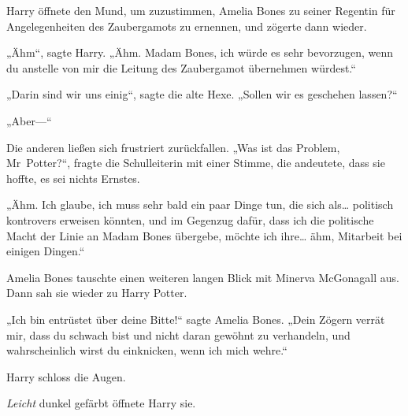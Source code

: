 Harry öffnete den Mund, um zuzustimmen, Amelia Bones zu seiner Regentin für Angelegenheiten des Zaubergamots zu ernennen, und zögerte dann wieder.

„Ähm“, sagte Harry. „Ähm. Madam Bones, ich würde es sehr bevorzugen, wenn du anstelle von mir die Leitung des Zaubergamot übernehmen würdest.“

„Darin sind wir uns einig“, sagte die alte Hexe. „Sollen wir es geschehen lassen?“

„Aber—“

Die anderen ließen sich frustriert zurückfallen.
„Was ist das Problem, Mr~Potter?“, fragte die Schulleiterin mit einer Stimme, die andeutete, dass sie hoffte, es sei nichts Ernstes.

„Ähm. Ich glaube, ich muss sehr bald ein paar Dinge tun, die sich als… politisch kontrovers erweisen könnten, und im Gegenzug dafür, dass ich die politische Macht der Linie an Madam Bones übergebe, möchte ich ihre… ähm, Mitarbeit bei einigen Dingen.“

Amelia Bones tauschte einen weiteren langen Blick mit Minerva McGonagall aus.
Dann sah sie wieder zu Harry Potter.

„Ich bin entrüstet über deine Bitte!“ sagte Amelia Bones. „Dein Zögern verrät mir, dass du schwach bist und nicht daran gewöhnt zu verhandeln, und wahrscheinlich wirst du einknicken, wenn ich mich wehre.“

Harry schloss die Augen.

\emph{Leicht} dunkel gefärbt öffnete Harry sie.

